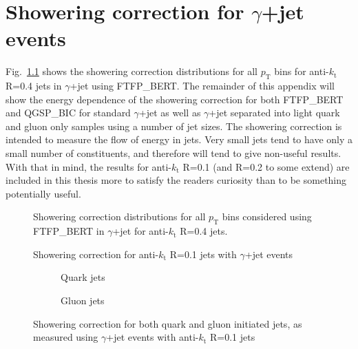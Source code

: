 \chapter{ Showering correction for $\gamma$+jet events}
Fig.~\ref{plot:GJetShoweringDists4App} shows the showering correction distributions for all $p_{\mathrm T}$ bins for anti-$k_{\mathrm t}$ R=0.4 jets in $\gamma$+jet using FTFP\_BERT.  
The remainder of this appendix will show the energy dependence of the showering correction for both FTFP\_BERT and QGSP\_BIC for standard $\gamma$+jet as well as $\gamma$+jet separated into light quark and gluon only samples using a number of jet sizes.  
The showering correction is intended to measure the flow of energy in jets.  
Very small jets tend to have only a small number of constituents, and therefore will tend to give non-useful results.  
With that in mind, the results for anti-$k_{\mathrm t}$ R=0.1 (and R=0.2 to some extend) are included in this thesis more to satisfy the readers curiosity than to be something potentially useful. 


\begin{figure}[!ht]
 \centering
 \caption[Showering correction distributions, anti-$k_{\mathrm t}$ R=0.4 with FTFP\_BERT]
 {\small Showering correction distributions for all $p_{\mathrm T}$ bins considered using FTFP\_BERT in $\gamma$+jet for anti-$k_{\mathrm t}$ R=0.4 jets.  } 
 \label{plot:GJetShoweringDists4App}
\end{figure}
\clearpage

\begin{figure}[!ht]
 \centering
 \caption[Showering correction for anti-$k_{\mathrm t}$ R=0.1 jets with $\gamma$+jet events]
 {\small Showering correction for anti-$k_{\mathrm t}$ R=0.1 jets with $\gamma$+jet events}
 \label{plot:GJetShowering1App}
\end{figure}

\begin{figure}[!ht]
 \centering
 \begin{subfigure}{.5\textwidth}
  \centering
  \caption{Quark jets}
 \end{subfigure}%
 \begin{subfigure}{.5\textwidth}
  \centering
  \caption{Gluon jets}
 \end{subfigure}
 \caption[Quark/gluon jet showering correction, anti-$k_{\mathrm t}$ R=0.1, $\gamma$+jet]
 {\small Showering correction for both quark and gluon initiated jets, as measured using $\gamma$+jet events with anti-$k_{\mathrm t}$ R=0.1 jets}
 \label{plot:GJetShoweringFlav1App}
\end{figure}

